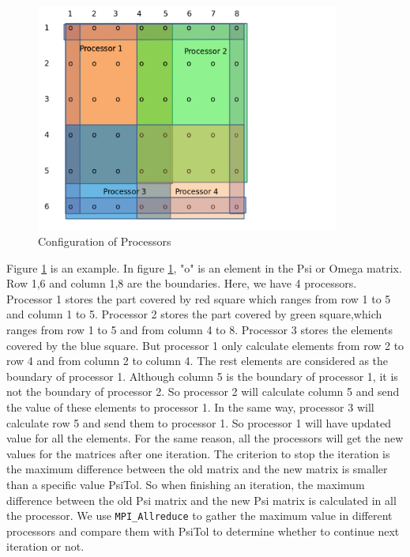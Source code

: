 \documentclass[twocolumn]{article}
\begin{document}
\begin{figure}[H]
\begin{center}
\includegraphics[width=10cm]{configuration.png}
\caption{Configuration of Processors}
\label{fig:configuration}
\end{center}
\end{figure}

Figure  \ref{fig:configuration} is an example.
In figure \ref{fig:configuration}, "o" is an element in the Psi or Omega matrix.
Row 1,6 and column 1,8 are the boundaries.
Here, we have 4 processors.
Processor 1 stores the part covered by red square
which ranges from row 1 to 5 and column 1 to 5.
Processor 2 stores the part covered by green square,which ranges from
row 1 to 5 and from column 4 to 8.
Processor 3 stores the elements covered by the blue square.
But processor 1 only calculate elements from row 2 to row 4 and from column
2 to column 4.
The rest elements are considered as the boundary of processor 1.
Although column 5 is the boundary of processor 1,  it is not the boundary
of processor 2.
So processor 2 will calculate column 5 and send the value of these elements
to processor 1. In the same way, processor 3 will calculate row 5 and send
them to processor 1.
So processor 1 will have updated value for all the elements.
For the same reason, all the processors will get the new values for the matrices
after one iteration.
The criterion to stop the iteration is the maximum difference between
the old matrix and the new matrix is smaller than a specific value PsiTol.
So when finishing an iteration, the maximum difference between the old Psi
matrix and the new Psi matrix is calculated in all the processor.
We use \texttt{MPI\_Allreduce} to gather the maximum value in different
processors and compare them with PsiTol to determine whether to continue
next iteration or not.
 
\end{document}
